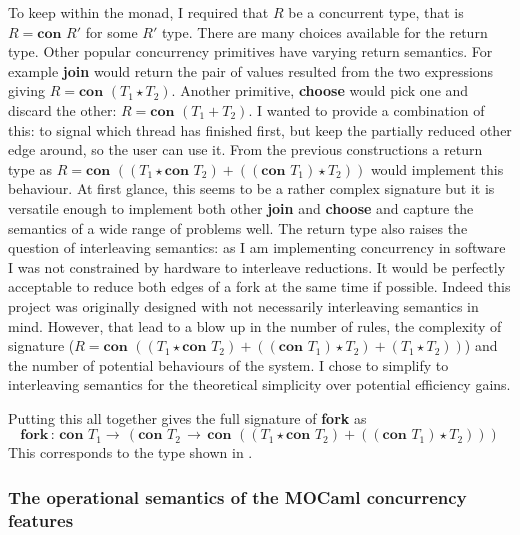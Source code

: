 \documentclass[12pt,twoside,notitlepage]{report}
\begin{document}
To keep within the monad, I required that $ R $ be a concurrent type, that is $ R =  \textbf{con } R' $ for some $ R' $ type. There are many choices available for the return type. Other popular concurrency primitives have varying return semantics. For example \textbf{join} would return the pair of values resulted from the two expressions giving $ R = \textbf{con }(T_1 \star T_2) $. Another primitive, \textbf{choose} would pick one and discard the other: $ R = \textbf{con }(T_1 + T_2) $. I wanted to provide a combination of this: to signal which thread has finished first, but keep the partially reduced other edge around, so the user can use it. From the previous constructions a return type as $ R = \textbf{con }((T_1\star \textbf{con } T_2) + ((\textbf{con } T_1) \star T_2)) $ would implement this behaviour. At first glance, this seems to be a rather complex signature but  it is versatile enough to implement both other \textbf{join} and \textbf{choose} and capture the semantics of a wide range of problems well. The return type also raises the question of interleaving semantics: as I am implementing concurrency in software I was not constrained by hardware to interleave reductions. It would be perfectly acceptable to reduce both edges of a fork at the same time if possible. Indeed this project was originally designed with not necessarily interleaving semantics in mind. However, that lead to a blow up in the number of rules, the complexity of signature ($ R = \textbf{con }((T_1\star \textbf{con } T_2) + ((\textbf{con } T_1) \star T_2) + (T_1 \star T_2))   $) and the number of potential behaviours of the system. I chose to simplify to interleaving semantics for the theoretical simplicity over potential efficiency gains.

Putting this all together gives the full signature of \textbf{fork} as 
\[ \textbf{fork} \, : \, \textbf{con } T_1 \rightarrow \, (\textbf{con } T_2\, \rightarrow\, \textbf{con }((T_1\star \textbf{con } T_2) + ((\textbf{con } T_1) \star T_2)) ) \] 
This corresponds to the type shown in .

\subsubsection{The operational semantics of the MOCaml concurrency features}
\end{document}
